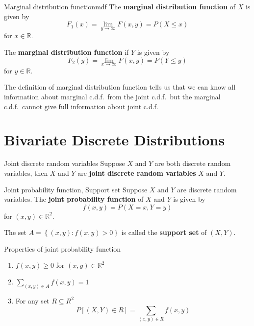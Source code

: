 \begin{Definition}{Marginal distribution function}{mdf}
    The \textbf{marginal distribution function} of $ X $ is given by
    \[ F_1(x)=\lim\limits_{{y} \to {\infty}} F(x,y)=P(X\leqslant x) \]
    for $ x\in\mathbb{R} $.

    The \textbf{marginal distribution function} if $ Y $ is given by
    \[ F_2(y)=\lim\limits_{{x} \to {\infty}} F(x,y)=P(Y\leqslant y) \]
    for $ y\in\mathbb{R} $.
\end{Definition}
\begin{Remark}{}{}
    The definition of marginal distribution
    function tells us that we can know all information
    about marginal c.d.f.\ from the joint c.d.f.\ but the
    marginal c.d.f.\ cannot give full information about
    joint c.d.f.\
\end{Remark}
\section{Bivariate Discrete Distributions}
\begin{Definition}{Joint discrete random variables}{}
    Suppose $ X $ and $ Y $ are both discrete random variables,
    then $ X $ and $ Y $ are \textbf{joint discrete random variables}
    $ X $ and $ Y $.
\end{Definition}

\begin{Definition}{Joint probability function, Support set}{}
    Suppose $ X $ and $ Y $ are discrete random variables.
    The \textbf{joint probability function} of $ X $ and $ Y $
    is given by
    \[ f(x,y)=P(X=x,Y=y) \]
    for $ (x,y)\in\mathbb{R}^2 $.

    The set $ A=\left\{ (x,y):f(x,y)>0 \right\} $ is called
    the \textbf{support set} of $ (X,Y) $.
\end{Definition}

\begin{Definition}{Properties of joint probability function}{}
    \begin{enumerate}[label=(\Roman*)]
        \item $ f(x,y)\geqslant 0 $ for $ (x,y)\in\mathbb{R}^2 $
        \item $ \displaystyle \sum\limits_{(x,y)\in A}
                  f(x,y)=1 $
        \item For any set $ R\subseteq R^2 $
              \[ P\left[ (X,Y)\in R \right]
                  =\sum\limits_{(x,y)\in R}f(x,y)  \]
    \end{enumerate}
\end{Definition}


